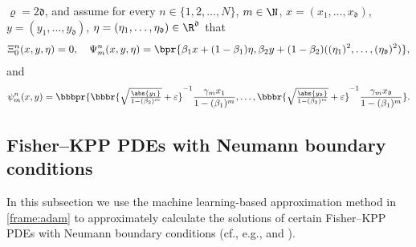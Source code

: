 \begin{algo}
			$ \varrho = 2 \mathfrak{d} $,
	and assume 
		for every
			$n \in \{1,2,\dots,N\}$,
			$m\in\N$,
			$x=(x_1, \ldots, x_{\mathfrak{d}})$, $y=(y_1, \ldots, y_{\mathfrak{d}})$, $\eta = ( \eta_1, \ldots , \eta_{\mathfrak{d}} )\in\R^{\mathfrak{d}}$
		that
		\begin{align}\label{eq:examples_setting_moment_estimation}
			\Xi^n_0(x,y,\eta) = 0,\quad 
			\Psi^n_m ( x , y , \eta )
			=
			\bpr{\beta_1 x + (1-\beta_1) \eta, \beta_2 y + (1-\beta_2) ((\eta_1)^2,\ldots,(\eta_{\mathfrak{d}})^2)},
		\end{align}
		and
		\begin{align}\label{eq:examples_setting_adam_grad_update}
			\psi^n_m ( x,y ) 
			=
			\bbbpr{
			\bbbr{
			\sqrt{\tfrac{\abs{y_1}}{1-(\beta_2)^m}} + \varepsilon
			}^{-1}
			\frac{\gamma_m x_{1}}{1-(\beta_1)^m},
			\ldots,
			\bbbr{
			\sqrt{\tfrac{\abs{y_{\mathfrak{d}}}}{1-(\beta_2)^m}} + \varepsilon
			}^{-1}
			\frac{\gamma_m x_{\mathfrak{d}}}{1-(\beta_1)^m}
			}
			.
	\end{align}
\end{algo}
%
%
%


\subsection{Fisher--KPP PDEs with Neumann boundary conditions}
\label{subsec:fisherKPP_neumann_r}
In this subsection we use the machine learning-based approximation method in \cref{frame:adam} to approximately calculate the solutions of certain Fisher--KPP PDEs with Neumann boundary conditions (cf., e.g., \cite{Bian2017} and \cite{Wang2021}).

